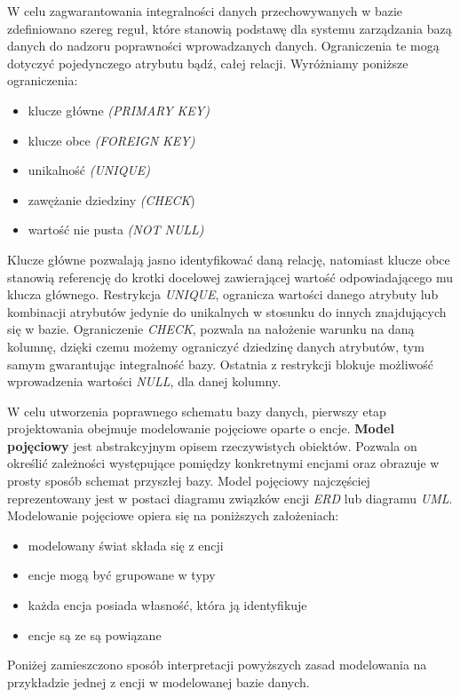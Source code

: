 \documentclass[a4paper]{article}
\begin{document}
W celu zagwarantowania integralności danych przechowywanych w bazie zdefiniowano szereg reguł, które stanowią podstawę dla systemu zarządzania bazą danych do nadzoru poprawności wprowadzanych danych. Ograniczenia te mogą dotyczyć pojedynczego atrybutu bądź, całej relacji. Wyróżniamy poniższe ograniczenia:
\begin{itemize}
    \item klucze główne \textit{(PRIMARY KEY)}
    \item klucze obce \textit{(FOREIGN KEY)}
    \item unikalność \textit{(UNIQUE)}
    \item zawężanie dziedziny \textit{(CHECK})
    \item wartość nie pusta \textit{(NOT NULL)}
\end{itemize}

Klucze główne pozwalają jasno identyfikować daną relację, natomiast klucze obce stanowią referencję do krotki docelowej zawierającej wartość odpowiadającego mu klucza głównego. Restrykcja \textit{UNIQUE}, ogranicza wartości danego atrybuty lub kombinacji atrybutów jedynie do unikalnych w stosunku do innych znajdujących się w bazie. Ograniczenie \textit{CHECK}, pozwala na nałożenie warunku na daną kolumnę, dzięki czemu możemy ograniczyć dziedzinę danych atrybutów, tym samym gwarantując integralność bazy. Ostatnia z restrykcji blokuje możliwość wprowadzenia wartości \textit{NULL}, dla danej kolumny.

\newpage

W celu utworzenia poprawnego schematu bazy danych, pierwszy etap projektowania obejmuje modelowanie pojęciowe oparte o encje. \textbf{Model pojęciowy} jest abstrakcyjnym opisem rzeczywistych obiektów. Pozwala on określić zależności występujące pomiędzy konkretnymi encjami oraz obrazuje w prosty sposób schemat przyszłej bazy. Model pojęciowy najczęściej reprezentowany jest w postaci diagramu związków encji \textit{ERD} lub diagramu \textit{UML}. Modelowanie pojęciowe opiera się na poniższych założeniach:
\begin{itemize}
    \item modelowany świat składa się z encji
    \item encje mogą być grupowane w typy
    \item każda encja posiada własność, która ją identyfikuje
    \item encje są ze są powiązane
\end{itemize}

Poniżej zamieszczono sposób interpretacji powyższych zasad modelowania na przykładzie jednej z encji w modelowanej bazie danych.
\end{document}
